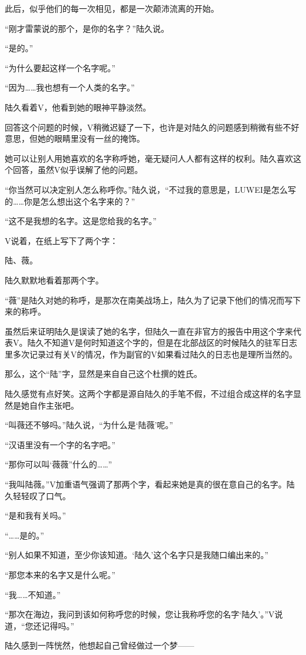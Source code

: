 此后，似乎他们的每一次相见，都是一次颠沛流离的开始。

“刚才雷蒙说的那个，是你的名字？”陆久说。

“是的。”

“为什么要起这样一个名字呢。”

“因为……我也想有一个人类的名字。”

陆久看着V，他看到她的眼神平静淡然。

回答这个问题的时候，V稍微迟疑了一下，也许是对陆久的问题感到稍微有些不好意思，但她的眼睛里没有一丝的掩饰。

她可以让别人用她喜欢的名字称呼她，毫无疑问人人都有这样的权利。陆久喜欢这个回答，虽然V似乎误解了他的问题。

“你当然可以决定别人怎么称呼你。”陆久说，“不过我的意思是，LUWEI是怎么写的……你是怎么想出这个名字来的？”

“这不是我想的名字。这是您给我的名字。”

V说着，在纸上写下了两个字：

陆、薇。

陆久默默地看着那两个字。

“薇”是陆久对她的称呼，是那次在南美战场上，陆久为了记录下他们的情况而写下来的称呼。

虽然后来证明陆久是误读了她的名字，但陆久一直在非官方的报告中用这个字来代表V。陆久不知道V是何时知道这个字的，但是在北部战区的时候陆久的驻军日志里多次记录过有关V的情况，作为副官的V如果看过陆久的日志也是理所当然的。

那么，这个“陆”字，显然是来自自己这个杜撰的姓氏。

陆久感觉有点好笑。这两个字都是源自陆久的手笔不假，不过组合成这样的名字显然是她自作主张吧。

“叫薇还不够吗。”陆久说，“为什么是‘陆薇’呢。”

“汉语里没有一个字的名字吧。”

“那你可以叫‘薇薇”什么的……”

“我叫陆薇。”V加重语气强调了那两个字，看起来她是真的很在意自己的名字。陆久轻轻叹了口气。

“是和我有关吗。”

“……是的。”

“别人如果不知道，至少你该知道。‘陆久’这个名字只是我随口编出来的。”

“那您本来的名字又是什么呢。”

“我……不知道。”

“那次在海边，我问到该如何称呼您的时候，您让我称呼您的名字‘陆久’。”V说道，“您还记得吗。”

陆久感到一阵恍然，他想起自己曾经做过一个梦——

